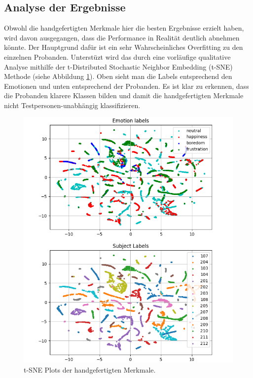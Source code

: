 \subsection{Analyse der Ergebnisse} \label{analyse-subsec}



Obwohl die handgefertigten Merkmale hier die besten Ergebnisse erzielt haben, wird davon ausgegangen, dass die Performance in Realität deutlich abnehmen könnte.
Der Hauptgrund dafür ist ein sehr Wahrscheinliches Overfitting zu den einzelnen Probanden. 
Unterstüzt wird das durch eine vorläufige qualitative Analyse mithilfe der t-Distributed Stochastic Neighbor Embedding (t-SNE) Methode (siehe Abbildung \ref{fig:overfitting}). 
Oben sieht man die Labels entsprechend den Emotionen und unten entsprechend der Probanden.
Es ist klar zu erkennen, dass die Probanden klarere Klassen bilden und damit die handgefertigten Merkmale nicht Testpersonen-unabhängig klassifizieren. \\


\begin{figure}[H]
\includegraphics[width=\textwidth]{Images/HCF-tSNE.png} 
\vspace{-0.3cm} \caption{ t-SNE Plots der handgefertigten Merkmale. }
\label{fig:overfitting} \end{figure} \vspace{0.5cm}


